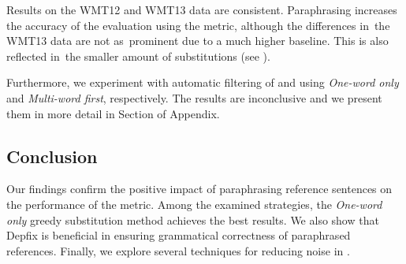 Results on the WMT12 and WMT13 data are consistent. Paraphrasing increases the accuracy of the evaluation using the \bleu metric, although the differences in~the WMT13 data are not as~prominent due to a much higher baseline. This is also reflected in~the smaller amount of substitutions (see ).

Furthermore, we experiment with automatic filtering of \fm and \cmpt using \emph{One-word only} and \emph{Multi-word first}, respectively. The results are inconclusive and we present them in more detail in Section  of Appendix.

\subsection{Conclusion}
Our findings confirm the positive impact of paraphrasing reference sentences on the performance of the \bleu metric. Among the examined strategies, the \emph{One-word only} greedy substitution method achieves the best results. We also show that Depfix is beneficial in ensuring grammatical correctness of paraphrased references. Finally, we explore several techniques for reducing noise in \mpt. 

